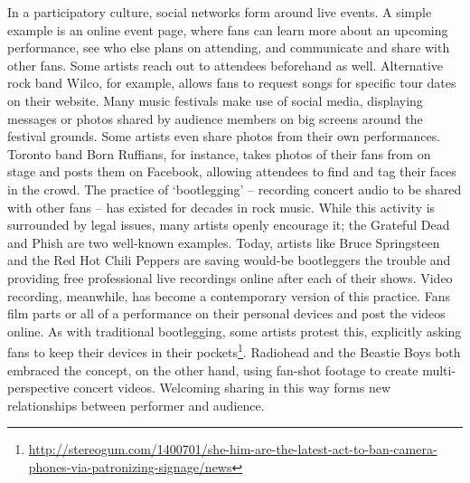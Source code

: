 In a participatory culture, social networks form around live events. A simple example is an online event page, where fans can learn more about an upcoming performance, see who else plans on attending, and communicate and share with other fans. Some artists reach out to attendees beforehand as well. Alternative rock band Wilco, for example, allows fans to request songs for specific tour dates on their website. Many music festivals make use of social media, displaying messages or photos shared by audience members on big screens around the festival grounds. Some artists even share photos from their own performances. Toronto band Born Ruffians, for instance, takes photos of their fans from on stage and posts them on Facebook, allowing attendees to find and tag their faces in the crowd. The practice of `bootlegging' -- recording concert audio to be shared with other fans -- has existed for decades in rock music. While this activity is surrounded by legal issues, many artists openly encourage it; the Grateful Dead and Phish are two well-known examples. Today, artists like Bruce Springsteen and the Red Hot Chili Peppers are saving would-be bootleggers the trouble and providing free professional live recordings online after each of their shows. Video recording, meanwhile, has become a contemporary version of this practice. Fans film parts or all of a performance on their personal devices and post the videos online. As with traditional bootlegging, some artists protest this, explicitly asking fans to keep their devices in their pockets\footnote{\url{http://stereogum.com/1400701/she-him-are-the-latest-act-to-ban-camera-phones-via-patronizing-signage/news}}. Radiohead and the Beastie Boys both embraced the concept, on the other hand, using fan-shot footage to create multi-perspective concert videos. Welcoming sharing in this way forms new relationships between performer and audience.
